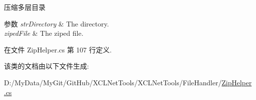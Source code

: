 压缩多层目录 


\begin{DoxyParams}{参数}
{\em str\-Directory} & The directory.\\
\hline
{\em ziped\-File} & The ziped file.\\
\hline
\end{DoxyParams}


在文件 Zip\-Helper.\-cs 第 107 行定义.



该类的文档由以下文件生成\-:\begin{DoxyCompactItemize}
\item 
D\-:/\-My\-Data/\-My\-Git/\-Git\-Hub/\-X\-C\-L\-Net\-Tools/\-X\-C\-L\-Net\-Tools/\-File\-Handler/\hyperlink{_zip_helper_8cs}{Zip\-Helper.\-cs}\end{DoxyCompactItemize}
